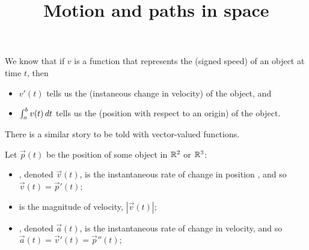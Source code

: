 \documentclass{ximera}
\title[Dig-In:]{Motion and paths in space}
\begin{document}
\begin{abstract}
\end{abstract}
\maketitle

We know that if $v$ is a function that represents the 
(signed speed) of an object at time $t$, then
\begin{itemize}
\item $v'(t)$ tells us the  (instaneous change in
  velocity) of the object, and
\item $\int_a^b v(t) \mathop{}\!d t$ tells us the  (position
  with respect to an origin) of the object.
\end{itemize}

There is a similar story to be told with vector-valued functions.

\begin{definition}
Let $\vec{p}(t)$ be the position of some object in $\mathbb R^2$ or $\mathbb R^3$:
\begin{itemize}
\item {}, denoted $\vec{v}(t)$, is the instantaneous rate
  of change in position , and so $\vec{v}(t) = \vec{p}'(t)$;
\item {} is the magnitude of velocity, $|\vec v(t)|$;
\item {}, denoted $\vec{a}(t)$, is the instantaneous
  rate of change in velocity, and so $\vec a(t) = \vec{v}'(t) =
  \vec{p}''(t)$;
\end{itemize}
\end{definition}
\end{document}
